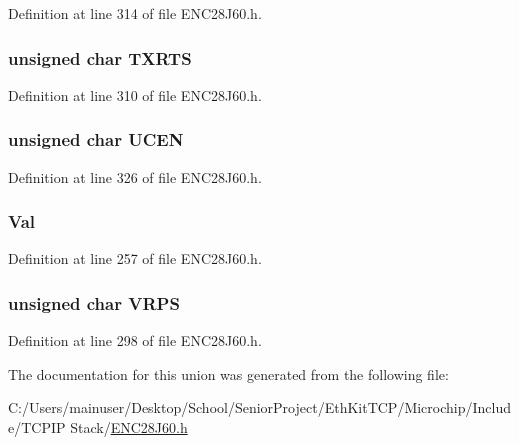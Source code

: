 Definition at line 314 of file E\+N\+C28\+J60.\+h.

\hypertarget{union___r_e_g_a3cde70ae54c261abb67708fb13cde610}{}
\subsubsection[{T\+X\+R\+T\+S}]{\setlength{\rightskip}{0pt plus 5cm}unsigned {\bf char} T\+X\+R\+T\+S}\label{union___r_e_g_a3cde70ae54c261abb67708fb13cde610}


Definition at line 310 of file E\+N\+C28\+J60.\+h.

\hypertarget{union___r_e_g_a6f748edd36f4110efe143e1a2afb7b18}{}
\subsubsection[{U\+C\+E\+N}]{\setlength{\rightskip}{0pt plus 5cm}unsigned {\bf char} U\+C\+E\+N}\label{union___r_e_g_a6f748edd36f4110efe143e1a2afb7b18}


Definition at line 326 of file E\+N\+C28\+J60.\+h.

\hypertarget{union___r_e_g_a5ab8c2bf45b20b5f7aa3a4f083896cec}{}
\subsubsection[{Val}]{ Val}\label{union___r_e_g_a5ab8c2bf45b20b5f7aa3a4f083896cec}


Definition at line 257 of file E\+N\+C28\+J60.\+h.

\hypertarget{union___r_e_g_a3e9ee3ad23dd9e25e857b5ab15a40471}{}
\subsubsection[{V\+R\+P\+S}]{\setlength{\rightskip}{0pt plus 5cm}unsigned {\bf char} V\+R\+P\+S}\label{union___r_e_g_a3e9ee3ad23dd9e25e857b5ab15a40471}


Definition at line 298 of file E\+N\+C28\+J60.\+h.



The documentation for this union was generated from the following file\+:\begin{DoxyCompactItemize}
\item 
C\+:/\+Users/mainuser/\+Desktop/\+School/\+Senior\+Project/\+Eth\+Kit\+T\+C\+P/\+Microchip/\+Include/\+T\+C\+P\+I\+P Stack/\hyperlink{_e_n_c28_j60_8h}{E\+N\+C28\+J60.\+h}\end{DoxyCompactItemize}
